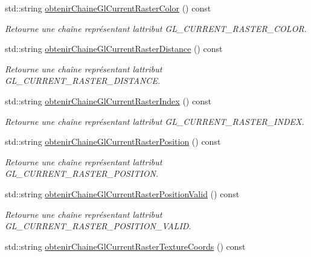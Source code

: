 \begin{DoxyCompactItemize}
std\+::string \hyperlink{group__utilitaire_ga62ef22c97a3ecc8c7e956f2fd7267b9d}{obtenir\+Chaine\+Gl\+Current\+Raster\+Color} () const 
\begin{DoxyCompactList}\small\item\em Retourne une chaîne représentant l\textquotesingle{}attribut G\+L\+\_\+\+C\+U\+R\+R\+E\+N\+T\+\_\+\+R\+A\+S\+T\+E\+R\+\_\+\+C\+O\+L\+O\+R. \end{DoxyCompactList}\item 
std\+::string \hyperlink{group__utilitaire_ga130c72bf45a65d7d7770c77c7f71cf5c}{obtenir\+Chaine\+Gl\+Current\+Raster\+Distance} () const 
\begin{DoxyCompactList}\small\item\em Retourne une chaîne représentant l\textquotesingle{}attribut G\+L\+\_\+\+C\+U\+R\+R\+E\+N\+T\+\_\+\+R\+A\+S\+T\+E\+R\+\_\+\+D\+I\+S\+T\+A\+N\+C\+E. \end{DoxyCompactList}\item 
std\+::string \hyperlink{group__utilitaire_ga9d14728a6f086186ff9ec92738952892}{obtenir\+Chaine\+Gl\+Current\+Raster\+Index} () const 
\begin{DoxyCompactList}\small\item\em Retourne une chaîne représentant l\textquotesingle{}attribut G\+L\+\_\+\+C\+U\+R\+R\+E\+N\+T\+\_\+\+R\+A\+S\+T\+E\+R\+\_\+\+I\+N\+D\+E\+X. \end{DoxyCompactList}\item 
std\+::string \hyperlink{group__utilitaire_ga1151f4eee3a50e14e0157b18b6fefaa4}{obtenir\+Chaine\+Gl\+Current\+Raster\+Position} () const 
\begin{DoxyCompactList}\small\item\em Retourne une chaîne représentant l\textquotesingle{}attribut G\+L\+\_\+\+C\+U\+R\+R\+E\+N\+T\+\_\+\+R\+A\+S\+T\+E\+R\+\_\+\+P\+O\+S\+I\+T\+I\+O\+N. \end{DoxyCompactList}\item 
std\+::string \hyperlink{group__utilitaire_gaa95c762062531085430d3bd8381c1ab1}{obtenir\+Chaine\+Gl\+Current\+Raster\+Position\+Valid} () const 
\begin{DoxyCompactList}\small\item\em Retourne une chaîne représentant l\textquotesingle{}attribut G\+L\+\_\+\+C\+U\+R\+R\+E\+N\+T\+\_\+\+R\+A\+S\+T\+E\+R\+\_\+\+P\+O\+S\+I\+T\+I\+O\+N\+\_\+\+V\+A\+L\+I\+D. \end{DoxyCompactList}\item 
std\+::string \hyperlink{group__utilitaire_gae1b30e504db9237dce13eade239c8c5a}{obtenir\+Chaine\+Gl\+Current\+Raster\+Texture\+Coords} () const 

\end{DoxyCompactItemize}
